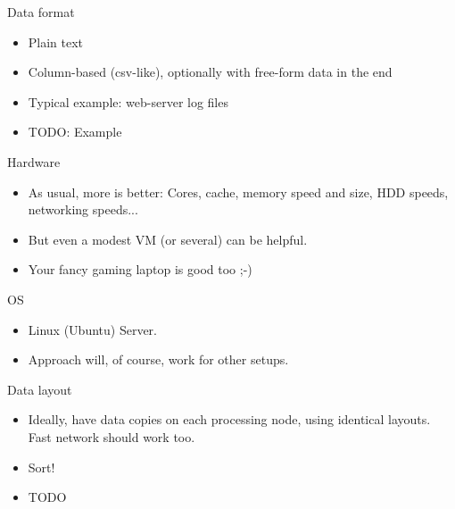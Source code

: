 \documentclass[handout]{beamer}
\begin{document}

\begin{frame}{Data format}

\begin{itemize}
\item Plain text
\item Column-based (csv-like), optionally with free-form data in the end
\item Typical example: web-server log files
\item TODO: Example
\end{itemize}

\end{frame}


\begin{frame}{Hardware}

\begin{itemize}
\item As usual, more is better: Cores, cache, memory speed and size,
      HDD speeds, networking speeds...
\item But even a modest VM (or several) can be helpful.
\item Your fancy gaming laptop is good too ;-)
\end{itemize}

\end{frame}


\begin{frame}{OS}

\begin{itemize}
\item Linux (Ubuntu) Server.
\item Approach will, of course, work for other setups.
\end{itemize}

\end{frame}


\begin{frame}{Data layout}

\begin{itemize}
\item Ideally, have data copies on each processing node, using identical
      layouts. Fast network should work too.
\item Sort!
\item TODO
\end{itemize}

\end{frame}
\end{document}

